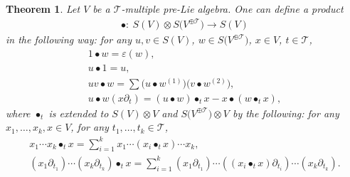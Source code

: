 \documentclass[10pt,a4paper]{amsart}
\numberwithin{equation}{section}
\newtheorem{Theorem}{Theorem}[section]
\newcommand{\T}{\mathcal{T}}
\begin{document}
\begin{Theorem}
Let $V$ be a $\T$-multiple pre-Lie algebra. One can define a product
\begin{gather*}
\bullet\colon\ S(V)\otimes S\big(V^{\oplus\T}\big)\longrightarrow S(V)
\end{gather*}
in the following way: for any $u,v \in S(V)$, $w\in S\big(V^{\oplus\T}\big)$, $x\in V$, $t\in \T$,
\begin{gather*}
1\bullet w=\varepsilon(w),
\\
u\bullet 1=u,
\\
uv\bullet w=\sum\big(u\bullet w^{(1)}\big)\big(v\bullet w^{(2)}\big),
\\
u\bullet w (x\partial_t)=(u\bullet w)\bullet_t x-x\bullet (w\bullet_t x),
\end{gather*}
where $\bullet_t$ is extended to $S(V)\otimes V$ and $S\big(V^{\oplus\T}\big)\otimes V$
by the following: for any $x_1,\dots,x_k,x\in V$, for any $t_1,\dots,t_k \in \T$,
\begin{gather*}
x_1\cdots x_k \bullet_t x=\sum_{i=1}^k x_1\cdots (x_i\bullet_t x)\cdots x_k,
\\
(x_1\partial_{t_1})\cdots (x_k\partial_{t_k}) \bullet_t x
=\sum_{i=1}^k (x_1\partial_{t_1})\cdots ((x_i\bullet_t x)\partial_{t_i})\cdots (x_k\partial_{t_k}).
\end{gather*}
\end{Theorem}
\end{document}
